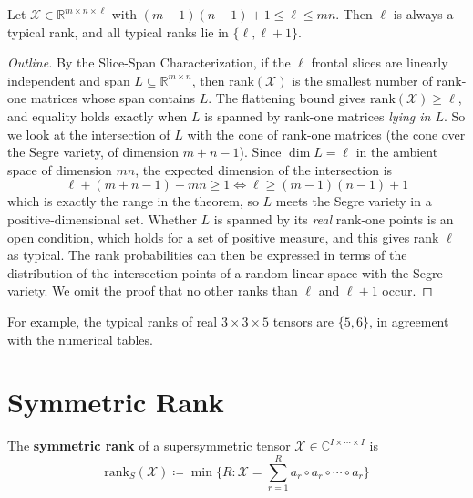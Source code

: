   \begin{theorem}
    Let $\mathcal{X} \in \mathbb{R}^{m \times n \times \ell}$ with $(m-1)(n-1) + 1 \leq \ell \leq mn$. Then $\ell$ is always a typical rank, and all typical ranks lie in $\{\ell, \ell + 1\}$. 
  \end{theorem}
  \begin{proof}[Outline]
    By the Slice-Span Characterization, if the $\ell$ frontal slices are linearly independent and span $L \subseteq \mathbb{R}^{m \times n}$, then $\mathrm{rank}(\mathcal{X})$ is the smallest number of rank-one matrices whose span contains $L$. The flattening bound gives $\mathrm{rank}(\mathcal{X}) \geq \ell$, and equality holds exactly when $L$ is spanned by rank-one matrices \textit{lying in $L$}. So we look at the intersection of $L$ with the cone of rank-one matrices (the cone over the Segre variety, of dimension $m + n - 1$). Since $\dim L = \ell$ in the ambient space of dimension $mn$, the expected dimension of the intersection is 
    \begin{equation}
      \ell + (m + n - 1) - mn \geq 1 \iff \ell \geq (m-1)(n-1) + 1
    \end{equation}
    which is exactly the range in the theorem, so $L$ meets the Segre variety in a positive-dimensional set. Whether $L$ is spanned by its \textit{real} rank-one points is an open condition, which holds for a set of positive measure, and this gives rank $\ell$ as typical. The rank probabilities can then be expressed in terms of the distribution of the intersection points of a random linear space with the Segre variety. We omit the proof that no other ranks than $\ell$ and $\ell+1$ occur. 
  \end{proof}
  For example, the typical ranks of real $3 \times 3 \times 5$ tensors are $\{5, 6\}$, in agreement with the numerical tables. 

\section{Symmetric Rank}

  \begin{definition}
    The \textbf{symmetric rank} of a supersymmetric tensor $\mathcal{X} \in \mathbb{C}^{I \times \cdots \times I}$ is
    \begin{equation}
      \mathrm{rank}_S(\mathcal{X}) \coloneqq \min \bigg\{ R : \mathcal{X} = \sum_{r=1}^R a_r \circ a_r \circ \cdots \circ a_r \bigg\}
    \end{equation}
  \end{definition}

